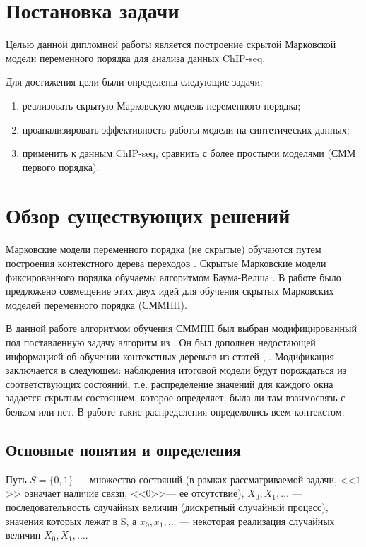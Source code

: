 \documentclass{matmex-diploma-custom}
\begin{document}
\section{Постановка задачи}
Целью данной дипломной работы является построение скрытой Марковской модели переменного
порядка для анализа данных ChIP-seq.

Для достижения цели были определены следующие задачи:
\begin{enumerate}
\item
реализовать скрытую Марковскую модель
переменного порядка;
\item
проанализировать 
эффективность работы модели на синтетических
данных;
\item
применить к данным ChIP-seq, сравнить с более простыми моделями (СММ
первого порядка).
\end{enumerate}


\section{Обзор существующих решений}
Марковские модели переменного порядка (не скрытые) обучаются путем построения контекстного дерева переходов \cite{Buhlmann1999}. Скрытые Марковские модели фиксированного порядка обучаемы алгоритмом Баума-Велша \cite{Rabiner1989}.
В работе \cite{Wang2006} было предложено совмещение этих двух идей для обучения скрытых Марковских моделей переменного порядка (СММПП).

В данной работе алгоритмом обучения СММПП был выбран модифицированный под поставленную задачу алгоритм  из \cite{Wang2006}. Он был дополнен недостающей информацией об обучении контекстных деревьев из статей \cite{Buhlmann1999}, \cite{Dumont2014}.
Модификация заключается в следующем: наблюдения итоговой модели будут порождаться из соответствующих состояний, т.е. распределение значений для каждого окна задается скрытым состоянием, которое определяет, была ли там взаимосвязь с белком или нет. В работе \cite{Wang2006} такие распределения определялись всем контекстом. 

\subsection{Основные понятия и определения}

Путь 
$ S = \{0, 1\} $ --- множество состояний (в рамках рассматриваемой задачи, <<$1$>> означает наличие связи, <<$0$>>--- ее отсутствие), 
$X_0, X_1, \ldots $ --- последовательность случайных величин (дискретный случайный процесс), значения которых лежат в S, а
$x_0, x_1, \ldots$ --- некоторая реализация случайных величин $X_0, X_1, \ldots $.
\end{document}
